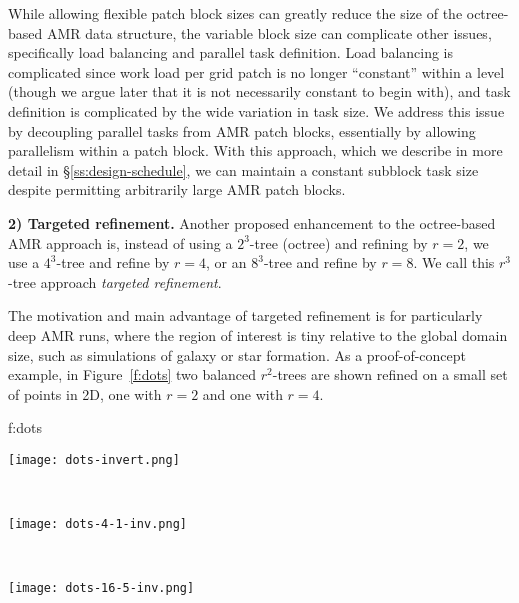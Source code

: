 \documentclass[10pt]{article}
\begin{document}
While allowing flexible patch block sizes can greatly reduce the size
of the octree-based AMR data structure, the variable block size can
complicate other issues, specifically load balancing and parallel task
definition.  Load balancing is complicated since work load per grid
patch is no longer ``constant'' within a level (though we argue later
that it is not necessarily constant to begin with), and task
definition is complicated by the wide variation in task size.  We
address this issue by decoupling parallel tasks from AMR patch blocks,
essentially by allowing parallelism within a patch block.  With this
approach, which we describe in more detail in
\S\ref{ss:design-schedule}, we can maintain a constant subblock task
size despite permitting arbitrarily large AMR patch blocks.



\textbf{2) Targeted refinement.}  Another proposed enhancement to the
octree-based AMR approach is, instead of using a $2^3$-tree (octree)
and refining by $r=2$, we use a $4^3$-tree and refine by $r=4$, or an
$8^3$-tree and refine by $r=8$.  We call this $r^3$-tree approach
\textit{targeted refinement}.

The motivation and main advantage of targeted refinement is for
particularly deep AMR runs, where the region of interest is tiny
relative to the global domain size, such as simulations of galaxy or
star formation.  As a proof-of-concept example, in Figure~\ref{f:dots}
two balanced $r^2$-trees are shown refined on a small set of points in 2D, one
with $r=2$ and one with $r=4$.

{f:dots}{
\begin{minipage}{7.0in}
\begin{minipage}{2.2in}
\texttt{[image: dots-invert.png]}
\end{minipage} \ 
\begin{minipage}{2.2in}
\texttt{[image: dots-4-1-inv.png]}
\end{minipage} \ 
\begin{minipage}{2.2in}
\texttt{[image: dots-16-5-inv.png]}
\end{minipage}
\end{minipage}}
\end{document}
